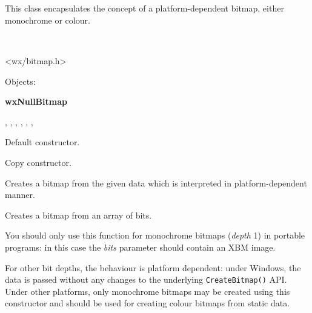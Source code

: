 \section{}\label{wxbitmap}

%
This class encapsulates the concept of a platform-dependent bitmap,
either monochrome or colour.


\\


<wx/bitmap.h>


Objects:

{\bf wxNullBitmap}


,
,
,
, , ,


\label{wxbitmapconstr}


Default constructor.


Copy constructor.


Creates a bitmap from the given data which is interpreted in platform-dependent
manner.


Creates a bitmap from an array of bits.

You should only use this function for monochrome bitmaps ({\it depth} 1) in
portable programs: in this case the {\it bits} parameter should contain an XBM
image.

For other bit depths, the behaviour is platform dependent: under Windows, the
data is passed without any changes to the underlying {\tt CreateBitmap()} API.
Under other platforms, only monochrome bitmaps may be created using this
constructor and  should be used for creating colour
bitmaps from static data.

